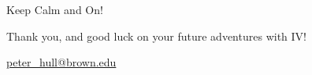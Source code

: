 \documentclass{beamer}
\begin{document}
\begin{frame}{Keep Calm and  On!}

\begin{center}
Thank you, and good luck on your future adventures with IV!

\bigskip
\url{peter_hull@brown.edu}

\end{center}
\end{frame}
\end{document}
